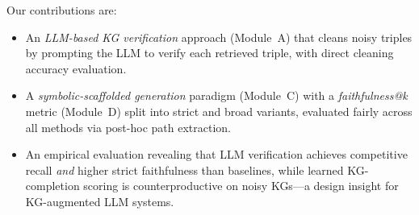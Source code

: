 Our contributions are:
\begin{itemize}
  \item An \emph{LLM-based KG verification} approach (Module~A) that cleans noisy triples by prompting the LLM to verify each retrieved triple, with direct cleaning accuracy evaluation.
  \item A \emph{symbolic-scaffolded generation} paradigm (Module~C) with a \emph{faithfulness@\textit{k}} metric (Module~D) split into strict and broad variants, evaluated fairly across all methods via post-hoc path extraction.
  \item An empirical evaluation revealing that LLM verification achieves competitive recall \emph{and} higher strict faithfulness than baselines, while learned KG-completion scoring is counterproductive on noisy KGs---a design insight for KG-augmented LLM systems.
\end{itemize}
